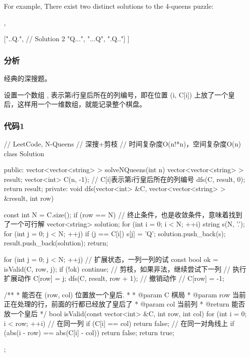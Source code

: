 For example,
There exist two distinct solutions to the 4-queens puzzle:
\begin{Code}
[
 [".Q..",  // Solution 1
  "...Q",
  "Q...",
  "..Q."],

 ["..Q.",  // Solution 2
  "Q...",
  "...Q",
  ".Q.."]
]
\end{Code}


\subsubsection{分析}

经典的深搜题。

设置一个数组 ,  表示第i行皇后所在的列编号，即在位置 (i, C[i]) 上放了一个皇后，这样用一个一维数组，就能记录整个棋盘。


\subsubsection{代码1}
\begin{Code}
// LeetCode, N-Queens
// 深搜+剪枝
// 时间复杂度O(n!*n)，空间复杂度O(n)
class Solution {
public:
    vector<vector<string> > solveNQueens(int n) {
        vector<vector<string> > result;
        vector<int> C(n, -1);  // C[i]表示第i行皇后所在的列编号
        dfs(C, result, 0);
        return result;
    }
private:
    void dfs(vector<int> &C, vector<vector<string> > &result, int row) {
        const int N = C.size();
        if (row == N) { // 终止条件，也是收敛条件，意味着找到了一个可行解
            vector<string> solution;
            for (int i = 0; i < N; ++i) {
                string s(N, '.');
                for (int j = 0; j < N; ++j) {
                    if (j == C[i]) s[j] = 'Q';
                }
                solution.push_back(s);
            }
            result.push_back(solution);
            return;
        }

        for (int j = 0; j < N; ++j) {  // 扩展状态，一列一列的试
            const bool ok = isValid(C, row, j);
            if (!ok) continue;  // 剪枝，如果非法，继续尝试下一列
            // 执行扩展动作
            C[row] = j;
            dfs(C, result, row + 1);
            // 撤销动作
            // C[row] = -1;
        }
    }
    
    /**
     * 能否在 (row, col) 位置放一个皇后.
     *
     * @param C 棋局
     * @param row 当前正在处理的行，前面的行都已经放了皇后了
     * @param col 当前列
     * @return 能否放一个皇后
     */
    bool isValid(const vector<int> &C, int row, int col) {
        for (int i = 0; i < row; ++i) {
            // 在同一列
            if (C[i] == col) return false;
            // 在同一对角线上
            if (abs(i - row) == abs(C[i] - col)) return false;
        }
        return true;
    }
};
\end{Code}


